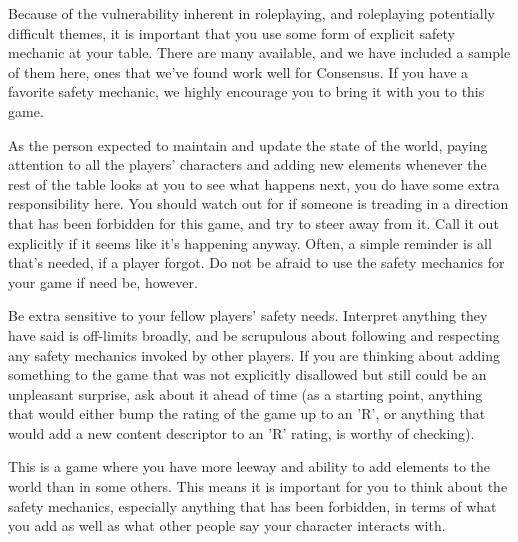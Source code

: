 \documentclass[
  oneside,
  statementpaper,
  9pt]{memoir}
\begin{document}
\begin{Narrator}

Because of the vulnerability inherent in roleplaying, and roleplaying potentially difficult themes, it is important that you use some form of explicit safety mechanic at your table. There are many available, and we have included a sample of them here, ones that we've found work well for Consensus. If you have a favorite safety mechanic, we highly encourage you to bring it with you to this game.

\end{Narrator}

\begin{MC}

As the person expected to maintain and update the state of the world, paying attention to all the players' characters and adding new elements whenever the rest of the table looks at you to see what happens next, you do have some extra responsibility here. You should watch out for if someone is treading in a direction that has been forbidden for this game, and try to steer away from it. Call it out explicitly if it seems like it's happening anyway. Often, a simple reminder is all that's needed, if a player forgot. Do not be afraid to use the safety mechanics for your game if need be, however.

Be extra sensitive to your fellow players' safety needs. Interpret anything they have said is off-limits broadly, and be scrupulous about following and respecting any safety mechanics invoked by other players. If you are thinking about adding something to the game that was not explicitly disallowed but still could be an unpleasant surprise, ask about it ahead of time (as a starting point, anything that would either bump the rating of the game up to an 'R', or anything that would add a new content descriptor to an 'R' rating, is worthy of checking).

\end{MC}

\begin{Player}

This is a game where you have more leeway and ability to add elements to the world than in some others. This means it is important for you to think about the safety mechanics, especially anything that has been forbidden, in terms of what you add as well as what other people say your character interacts with.

\end{Player}
\end{document}
